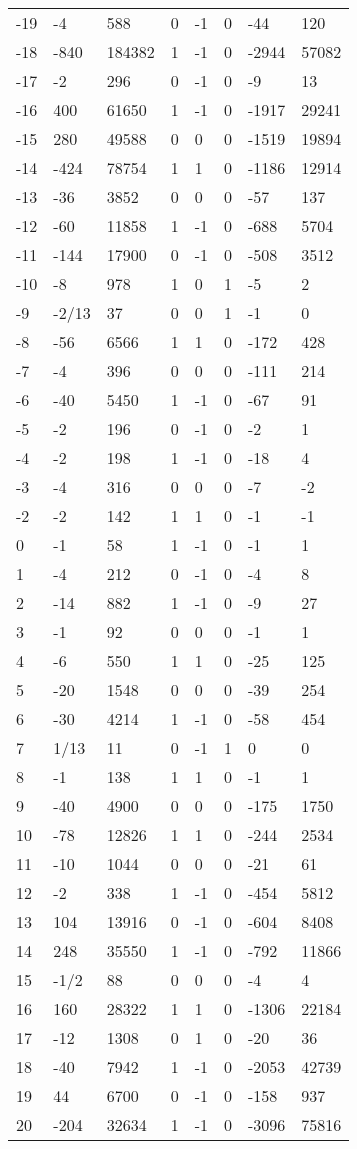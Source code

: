 \documentclass{amsart}
\begin{document}
\begin{longtable}{|l|l|l|lllll|}
-19&-4&588&0&-1&0&-44&120\\
-18&-840&184382&1&-1&0&-2944&57082\\
-17&-2&296&0&-1&0&-9&13\\
-16&400&61650&1&-1&0&-1917&29241\\
-15&280&49588&0&0&0&-1519&19894\\
-14&-424&78754&1&1&0&-1186&12914\\
-13&-36&3852&0&0&0&-57&137\\
-12&-60&11858&1&-1&0&-688&5704\\
-11&-144&17900&0&-1&0&-508&3512\\
-10&-8&978&1&0&1&-5&2\\
-9&-2/13&37&0&0&1&-1&0\\
-8&-56&6566&1&1&0&-172&428\\
-7&-4&396&0&0&0&-111&214\\
-6&-40&5450&1&-1&0&-67&91\\
-5&-2&196&0&-1&0&-2&1\\
-4&-2&198&1&-1&0&-18&4\\
-3&-4&316&0&0&0&-7&-2\\
-2&-2&142&1&1&0&-1&-1\\
0&-1&58&1&-1&0&-1&1\\
1&-4&212&0&-1&0&-4&8\\
2&-14&882&1&-1&0&-9&27\\
3&-1&92&0&0&0&-1&1\\
4&-6&550&1&1&0&-25&125\\
5&-20&1548&0&0&0&-39&254\\
6&-30&4214&1&-1&0&-58&454\\
7&1/13&11&0&-1&1&0&0\\
8&-1&138&1&1&0&-1&1\\
9&-40&4900&0&0&0&-175&1750\\
10&-78&12826&1&1&0&-244&2534\\
11&-10&1044&0&0&0&-21&61\\
12&-2&338&1&-1&0&-454&5812\\
13&104&13916&0&-1&0&-604&8408\\
14&248&35550&1&-1&0&-792&11866\\
15&-1/2&88&0&0&0&-4&4\\
16&160&28322&1&1&0&-1306&22184\\
17&-12&1308&0&1&0&-20&36\\
18&-40&7942&1&-1&0&-2053&42739\\
19&44&6700&0&-1&0&-158&937\\
20&-204&32634&1&-1&0&-3096&75816\\

\end{longtable}
\end{document}
